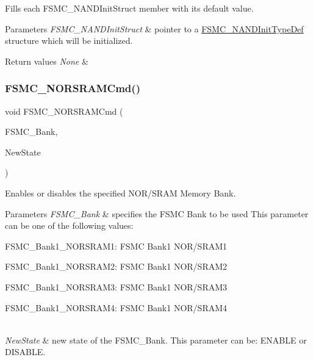 Fills each F\+S\+M\+C\+\_\+\+N\+A\+N\+D\+Init\+Struct member with its default value. 


\begin{DoxyParams}{Parameters}
{\em F\+S\+M\+C\+\_\+\+N\+A\+N\+D\+Init\+Struct} & pointer to a \mbox{\hyperlink{struct_f_s_m_c___n_a_n_d_init_type_def}{F\+S\+M\+C\+\_\+\+N\+A\+N\+D\+Init\+Type\+Def}} structure which will be initialized. \\
\hline
\end{DoxyParams}

\begin{DoxyRetVals}{Return values}
{\em None} & \\
\hline
\end{DoxyRetVals}
\mbox{\label{group___f_s_m_c___exported___functions_gaf943f0f2680168d3a95a3c2c9f3eca2a}} 
\subsubsection{\texorpdfstring{FSMC\_NORSRAMCmd()}{FSMC\_NORSRAMCmd()}}
{\footnotesize\ttfamily void F\+S\+M\+C\+\_\+\+N\+O\+R\+S\+R\+A\+M\+Cmd (\begin{DoxyParamCaption}\item[{uint32\+\_\+t}]{F\+S\+M\+C\+\_\+\+Bank,  }\item[{\mbox{\hyperlink{group___exported__types_gac9a7e9a35d2513ec15c3b537aaa4fba1}{Functional\+State}}}]{New\+State }\end{DoxyParamCaption})}



Enables or disables the specified N\+O\+R/\+S\+R\+AM Memory Bank. 


\begin{DoxyParams}{Parameters}
{\em F\+S\+M\+C\+\_\+\+Bank} & specifies the F\+S\+MC Bank to be used This parameter can be one of the following values\+: \begin{DoxyItemize}
\item F\+S\+M\+C\+\_\+\+Bank1\+\_\+\+N\+O\+R\+S\+R\+A\+M1\+: F\+S\+MC Bank1 N\+O\+R/\+S\+R\+A\+M1\end{DoxyItemize}
\begin{DoxyItemize}
\item F\+S\+M\+C\+\_\+\+Bank1\+\_\+\+N\+O\+R\+S\+R\+A\+M2\+: F\+S\+MC Bank1 N\+O\+R/\+S\+R\+A\+M2 \item F\+S\+M\+C\+\_\+\+Bank1\+\_\+\+N\+O\+R\+S\+R\+A\+M3\+: F\+S\+MC Bank1 N\+O\+R/\+S\+R\+A\+M3 \item F\+S\+M\+C\+\_\+\+Bank1\+\_\+\+N\+O\+R\+S\+R\+A\+M4\+: F\+S\+MC Bank1 N\+O\+R/\+S\+R\+A\+M4 \end{DoxyItemize}
\\
\hline
{\em New\+State} & new state of the F\+S\+M\+C\+\_\+\+Bank. This parameter can be\+: E\+N\+A\+B\+LE or D\+I\+S\+A\+B\+LE. \\
\hline
\end{DoxyParams}

